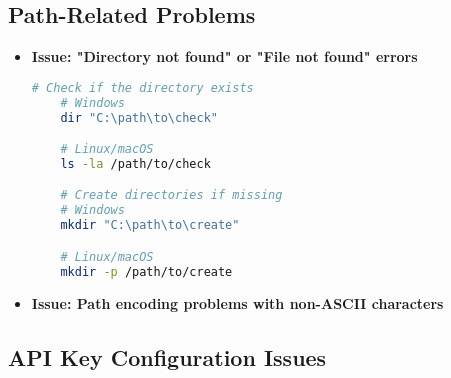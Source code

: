 \subsection{Path-Related Problems}

\begin{itemize}
    \item \textbf{Issue: "Directory not found" or "File not found" errors}

    \begin{commandbox}
    \begin{lstlisting}[language=Bash]
    # Check if the directory exists
    # Windows
    dir "C:\path\to\check"

    # Linux/macOS
    ls -la /path/to/check

    # Create directories if missing
    # Windows
    mkdir "C:\path\to\create"

    # Linux/macOS
    mkdir -p /path/to/create
    \end{lstlisting}
    \end{commandbox}


    \item \textbf{Issue: Path encoding problems with non-ASCII characters}

\end{itemize}

\subsection{API Key Configuration Issues}


